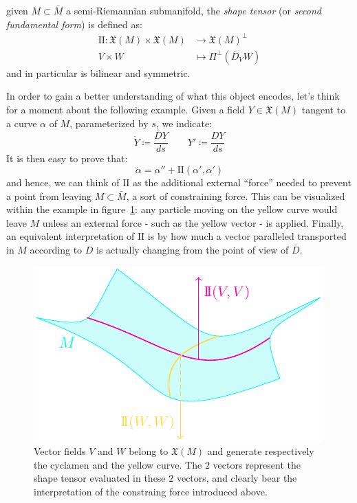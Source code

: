 \begin{definition}
	given \(M \subset \bar{M}\) a semi-Riemannian submanifold, the \emph{shape tensor} (or \emph{second fundamental form}) is defined as:
	\begin{align*}
		\mathrm{I\!I} : \mathfrak{X}(M) \times \mathfrak{X}(M) &\longrightarrow \mathfrak{X}(M)^{\perp}\\
							V \times W &\mapsto \Pi^{\perp}\left(\bar{D}_V W\right)
	\end{align*}
	\noindent and in particular is bilinear and symmetric.
\end{definition}

In order to gain a better understanding of what this object encodes, let's think for a moment about the following example. Given a field \(Y \in \mathfrak{X}(M)\) tangent to a curve \(\alpha\) of \(M\), parameterized by \(s\), we indicate:
\[
\dot{Y} \coloneqq \frac{\bar{D}Y}{ds} \quad \quad Y' \coloneqq \frac{DY}{ds}
\]
It is then easy to prove that:
\[
\ddot{\alpha} = \alpha'' + \mathrm{I\!I}(\alpha', \alpha')
\]
and hence, we can think of \(\mathrm{I\!I}\) as the additional external ``force'' needed to prevent a point from leaving \(M \subset \bar{M}\), a sort of constraining force.
This can be visualized within the example in figure~\ref{fig:shape-tensor}: any particle moving on the yellow curve would leave \(M\) unless an external force - such as the yellow vector - is applied.
Finally, an equivalent interpretation of \(\mathrm{I\!I}\) is by how much a vector paralleled transported in \(M\) according to \(D\) is actually changing from the point of view of \(\bar{D}\).

\begin{figure}
	\caption[]{Vector fields \(V\) and \(W\) belong to \(\mathfrak{X}(M)\) and generate respectively the cyclamen and the yellow curve. The \(2\) vectors represent the shape tensor evaluated in these \(2\) vectors, and clearly bear the interpretation of the constraing force introduced above.}
	\label{fig:shape-tensor}
	\centering
	\includegraphics[scale=1.7]{Immagini/shape-tensor/shape-tensor.pdf}
\end{figure}

